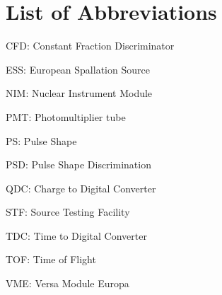 \documentclass[main.tex]{subfiles}
\begin{document}
\section*{List of Abbreviations}
CFD: Constant Fraction Discriminator

ESS: European Spallation Source

NIM: Nuclear Instrument Module

PMT: Photomultiplier tube

PS: Pulse Shape

PSD: Pulse Shape Discrimination

QDC: Charge to Digital Converter

STF: Source Testing Facility

TDC: Time to Digital Converter

TOF: Time of Flight

VME: Versa Module Europa
\end{document}
